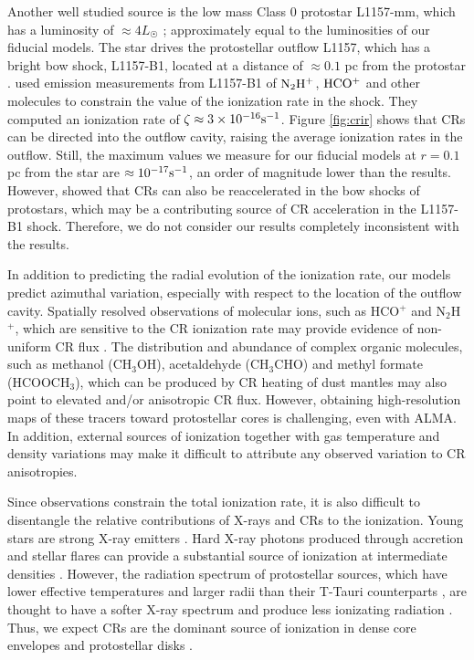 \documentclass[twocolumn]{aastex63}
\begin{document}
Another well studied source is the low mass Class 0 protostar L1157-mm, which has a luminosity of $\approx 4 L_{\astrosun}$ \citep{podio_2014_shock}; approximately equal to the luminosities of our fiducial models. The star drives the protostellar outflow L1157, which has a bright bow shock, L1157-B1, located at a distance of $\approx 0.1$ pc from the protostar \citep{podio_2014_shock}. \cite{podio_2014_shock} used emission measurements from L1157-B1 of $\rm N_2H^+$, $\rm HCO^+$ and other molecules to constrain the value of the ionization rate in the shock. They computed an ionization rate of $\zeta \approx 3 \times 10^{-16} \rm s^{-1}$. Figure \ref{fig:crir} shows that CRs can be directed into the outflow cavity, raising the average ionization rates in the outflow. Still, the maximum values we measure for our fiducial models at $r=0.1$ pc from the star are $\approx 10^{-17} \rm s^{-1}$, an order of magnitude lower than the \cite{podio_2014_shock} results. However, \cite{padovani_2016_protostars} showed that CRs can also be reaccelerated in the bow shocks of protostars, which may be a contributing source of CR acceleration in the L1157-B1 shock. Therefore, we do not consider our results completely inconsistent with the \cite{podio_2014_shock} results.  

In addition to predicting the radial evolution of the ionization rate, our models predict azimuthal variation, especially with respect to the location of the outflow cavity. Spatially resolved observations of molecular ions, such as HCO$^{+}$ and N$_2$H$^+$, which are sensitive to the CR ionization rate may provide evidence of non-uniform CR flux \citep{cleeves2015, seifert_2021_bfield}. The distribution and abundance of complex organic molecules, such as methanol (CH$_3$OH), acetaldehyde (CH$_3$CHO) and methyl formate (HCOOCH$_3$), which can be produced by CR heating of dust mantles \citep{ivlev2015,jimenez-serra2016,lopez-sepulcre2017,harju2020} may also point to elevated and/or anisotropic CR flux. However, obtaining high-resolution maps of these tracers toward protostellar cores is challenging, even with ALMA. In addition, external sources of ionization together with gas temperature and density variations may make it difficult to attribute any observed variation to CR anisotropies.

Since observations constrain the total ionization rate, it is also difficult to disentangle the relative contributions of  X-rays and CRs to the ionization. Young stars are strong X-ray emitters \citep[e.g.,][]{preibisch2005}. Hard X-ray photons produced through accretion and stellar flares
can provide a substantial source of ionization at intermediate densities \citep{glassgold1997,cleeves2015}. However, the radiation spectrum of protostellar sources, which have lower effective temperatures and larger radii than their T-Tauri counterparts \citep[e.g.,][]{hosokawa_2011_model}, are thought to have a softer X-ray spectrum and produce less ionizating radiation \citep{skinner1997}. Thus, we expect CRs are the dominant source of ionization in dense core envelopes and protostellar disks \citep{offner_2019_disks}.
\end{document}
